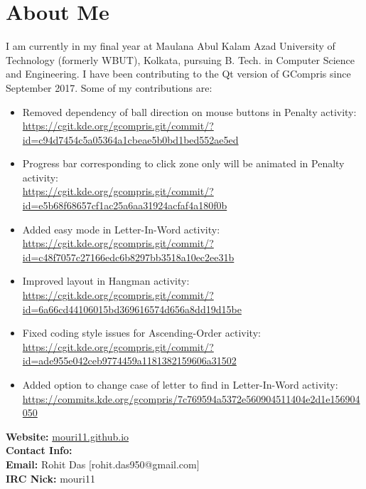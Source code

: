\documentclass[preprint,12pt]{elsarticle}
\begin{document}
\section{About Me}
\label{S:1}
{I am currently in my final year at Maulana Abul Kalam Azad University of Technology (formerly WBUT), Kolkata, pursuing B. Tech. in Computer Science and Engineering. I have been contributing to the Qt version of GCompris since September 2017. Some of my contributions are:}
\begin{itemize}
\item {Removed dependency of ball direction on mouse buttons in Penalty activity:\\
\href{https://cgit.kde.org/gcompris.git/commit/?id=c94d7454c5a05364a1cbeae5b0bd1bed552ae5ed}{https://cgit.kde.org/gcompris.git/commit/?id=c94d7454c5a05364a1cbeae5b0bd1bed552ae5ed}}

\item {Progress bar corresponding to click zone only will be animated in Penalty activity:\\
 \href{https://cgit.kde.org/gcompris.git/commit/?id=e5b68f68657cf1ac25a6aa31924acfaf4a180f0b}{https://cgit.kde.org/gcompris.git/commit/?id=e5b68f68657cf1ac25a6aa31924acfaf4a180f0b}}

\item {Added easy mode in Letter-In-Word activity:\\
\href{https://cgit.kde.org/gcompris.git/commit/?id=c48f7057c27166edc6b8297bb3518a10ec2ee31b}{https://cgit.kde.org/gcompris.git/commit/?id=c48f7057c27166edc6b8297bb3518a10ec2ee31b}}

\item {Improved layout in Hangman activity:\\
\href{https://cgit.kde.org/gcompris.git/commit/?id=6a66cd44106015bd369616574d656a8dd19d15be}{https://cgit.kde.org/gcompris.git/commit/?id=6a66cd44106015bd369616574d656a8dd19d15be}}

\item {Fixed coding style issues for Ascending-Order activity:\\
\href{https://cgit.kde.org/gcompris.git/commit/?id=ade955e042ceb9774459a1181382159606a31502}{https://cgit.kde.org/gcompris.git/commit/?id=ade955e042ceb9774459a1181382159606a31502}}

\item {Added option to change case of letter to find in Letter-In-Word activity:\\
\href{https://commits.kde.org/gcompris/7c769594a5372e560904511404e2d1e156904050}{https://commits.kde.org/gcompris/7c769594a5372e560904511404e2d1e156904050}}
\end{itemize}
\bigskip
\textbf{Website: }\href{mouri11.github.io}{mouri11.github.io}\\
\textbf{Contact Info:}\\
\textbf{Email: }{Rohit Das $[$rohit.das950@gmail.com$]$}\\
\textbf{IRC Nick: } mouri11
\end{document}
